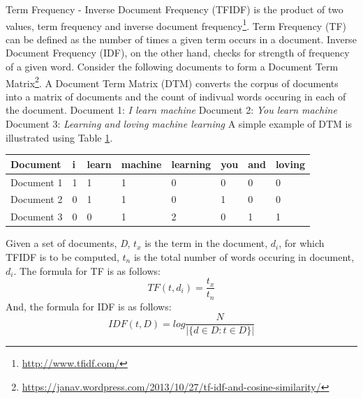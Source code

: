 \documentclass[a4paper,12pt,twoside]{report}
\begin{document}
Term Frequency - Inverse Document Frequency (TFIDF) is the product of two values, term frequency and inverse document frequency\footnote{\url{http://www.tfidf.com/}}. Term Frequency (TF) can be defined as the number of times a given term occurs in a document. Inverse Document Frequency (IDF), on the other hand, checks for strength of frequency of a given word. 
\bigbreak
Consider the following documents to form a Document Term Matrix\footnote{\url{https://janav.wordpress.com/2013/10/27/tf-idf-and-cosine-similarity/}}.  A Document Term Matrix (DTM) converts the corpus of documents into a matrix of documents and the count of indivual words occuring in each of the document. 
\bigbreak
Document 1: \textit{I learn machine} 
\bigbreak
Document 2: \textit{You learn machine} 
\bigbreak
Document 3: \textit{Learning and loving machine learning}
\bigbreak
A simple example of DTM is illustrated using Table \ref{tab:dtmExample}. 
\begin{table} %
    \centering
    \begin{adjustbox}{max width=\columnwidth}
    \def\arraystretch{1} %
    \begin{tabular}{p{3cm} p{2cm} p{2cm} p{2cm} p{2cm} p{2cm} p{2cm} p{2cm}}
        \toprule
        \textbf{Document} & \textbf{i} & \textbf{learn} & \textbf{machine} & \textbf{learning} & \textbf{you} & \textbf{and} & \textbf{loving}\\
        \midrule
			Document 1 & 1 & 1 & 1 & 0 & 0 & 0 & 0\\
			Document 2 & 0 & 1 & 1 & 0 & 1 & 0 & 0 \\ 
			Document 3 & 0 & 0 & 1 & 2 & 0 & 1 & 1 \\
        \midrule
    \end{tabular}
    \end{adjustbox}
    \label{tab:dtmExample}
\end{table}
\bigbreak
Given a set of documents, \textit{D}, \textit{$t_x$} is the term in the document, \textit{$d_i$}, for which TFIDF is to be computed, \textit{$t_n$} is the total number of words occuring in document, \textit{$d_i$}.
\bigbreak
The formula for TF is as follows:
\begin{equation}
\label{eq:et}
    TF(t, d_i) = \frac{t_x}{t_n}
\end{equation}
And, the formula for IDF is as follows:
\begin{equation}
\label{eq:et}
    IDF(t, D) = log\frac{N}{|\{d \in D : t \in D\}|}
\end{equation}
\end{document}
